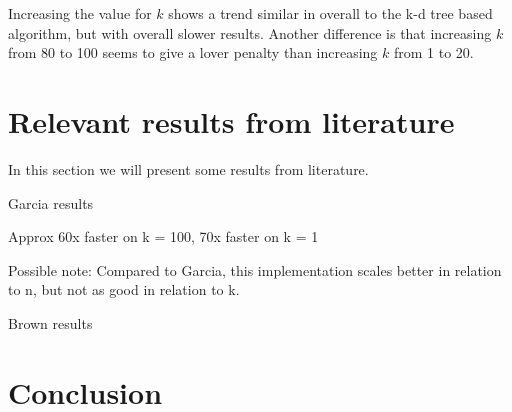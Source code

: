 Increasing the value for $k$ shows a trend similar in overall to the k-d tree based algorithm, but with overall slower results. Another difference is that increasing $k$ from 80 to 100 seems to give a lover penalty than increasing $k$ from 1 to 20.

\section{Relevant results from literature} %
\label{sec:Relevant_results_from_literature}
In this section we will present some results from literature.

Garcia results \cite{Garcia2010}

Approx 60x faster on k = 100, 70x faster on k = 1

Possible note: Compared to Garcia, this implementation scales better in relation to n, but not as good in relation to k.

Brown results \cite{Brown2010}

\section{Conclusion} %
\label{sec:conclusion}

